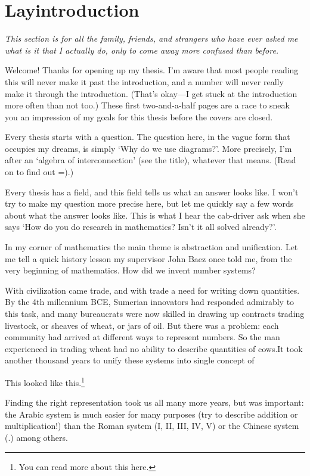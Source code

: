 {}
\chapter*{Layintroduction}

\textit{This section is for all the family, friends, and strangers who have ever
asked me what is it that I actually do, only to come away more confused than
before.}

Welcome! Thanks for opening up my thesis. I'm aware that most people reading
this will never make it past the introduction, and a number will never really
make it through the introduction. (That's okay---I get stuck at the introduction
more often than not too.) These first two-and-a-half pages are a race to sneak
you an impression of my goals for this thesis before the covers are closed. 

Every thesis starts with a question. The question here, in the vague form that
occupies my dreams, is simply `Why do we use diagrams?'. More precisely, I'm
after an `algebra of interconnection' (see the title), whatever that means.
(Read on to find out =).)

Every thesis has a field, and this field tells us what an answer looks like. I
won't try to make my question more precise here, but let me quickly say a few
words about what the answer looks like. This is what I hear the cab-driver 
ask when she says `How do you do research in mathematics? Isn't it all solved
already?'.

In my corner of mathematics the main theme is abstraction and unification. Let
me tell a quick history lesson my supervisor John Baez once told me, from the
very beginning of mathematics. How did we invent number systems?

With civilization came trade, and with trade a need for writing down quantities.
By the 4th millennium BCE, Sumerian innovators had responded admirably to this
task, and many bureaucrats were now skilled in drawing up contracts trading
livestock, or sheaves of wheat, or jars of oil. But there was a problem: each
community had arrived at different ways to represent numbers. So the man
experienced in trading wheat had no ability to describe quantities of cows.It
took another thousand years to unify these systems into single concept of 

This looked like this.\footnote{You can read more about this here.}

Finding the right representation took us all many more years, but was important:
the Arabic system is much easier for many purposes (try to describe addition or
multiplication!) than the Roman system (I, II, III, IV, V) or the Chinese system
(.) among others.

